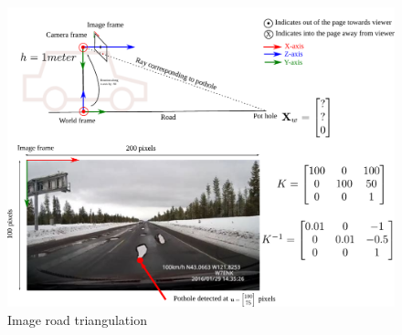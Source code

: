 \documentclass{article}
\begin{document}
\begin{figure}
  \includegraphics[width=\linewidth]{media/image-road-triangulation.pdf}
  \caption{Image road triangulation}
  \label{fig:image-road-triangulation}
\end{figure}
\end{document}
